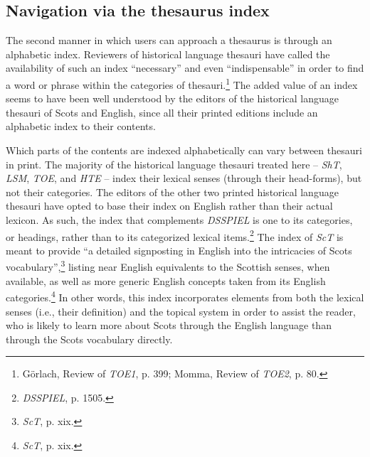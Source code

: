\subsection{Navigation via the thesaurus index}

The second manner in which users can approach a thesaurus is through an alphabetic index. Reviewers of historical language thesauri have called the availability of such an index ``necessary'' and even ``indispensable'' in order to find a word or phrase within the categories of thesauri.\footnote{Görlach, Review of \textit{TOE1}, p. 399; Momma, Review of \textit{TOE2}, p. 80.} The added value of an index seems to have been well understood by the editors of the historical language thesauri of Scots and English, since all their printed editions include an alphabetic index to their contents. 

Which parts of the contents are indexed alphabetically can vary between thesauri in print. The majority of the historical language thesauri treated here -- \textit{ShT}, \textit{LSM}, \textit{TOE}, and \textit{HTE} -- index their lexical senses (through their head-forms), but not their categories. The editors of the other two printed historical language thesauri have opted to base their index on English rather than their actual lexicon. As such, the index that complements \textit{DSSPIEL} is one to its categories, or headings, rather than to its categorized lexical items.\footnote{\textit{DSSPIEL}, p. 1505.} The index of \textit{ScT} is meant to provide ``a detailed signposting in English into the intricacies of Scots vocabulary'',\footnote{\textit{ScT}, p. xix.} listing near English equivalents to the Scottish senses, when available, as well as more generic English concepts taken from its English categories.\footnote{\textit{ScT}, p. xix.} In other words, this index incorporates elements from both the lexical senses (i.e., their definition) and the topical system in order to assist the reader, who is likely to learn more about Scots through the English language than through the Scots vocabulary directly.

